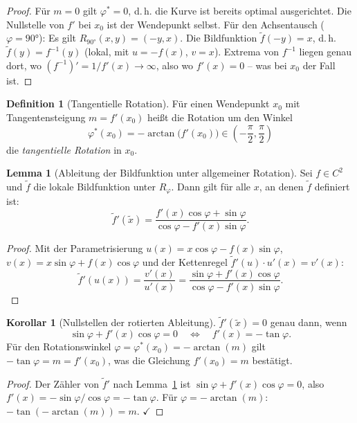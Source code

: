 ﻿\documentclass[12pt, a4paper]{article}
\theoremstyle{definition}
\newtheorem{definition}{Definition}[section]
\newtheorem{lemma}{Lemma}[section]
\newtheorem{korollar}{Korollar}[section]
\begin{document}
	\begin{proof}
		Für $m = 0$ gilt $\varphi^* = 0$, d.\,h. die Kurve ist bereits optimal
		ausgerichtet. Die Nullstelle von $f'$ bei $x_0$ ist der Wendepunkt selbst.
		Für den Achsentausch ($\varphi = 90 °$): Es gilt
		$R_{90 °}(x, y) = (-y, x)$. Die Bildfunktion $\tilde{f}(-y) = x$,
		d.\,h. $\tilde{f}(y) = f^{-1}(y)$ (lokal, mit $u = -f(x)$, $v = x$).
		Extrema von $f^{-1}$ liegen genau dort, wo $(f^{-1})' = 1/f'(x) \to \infty$,
		also wo $f'(x) = 0$ -- was bei $x_0$ der Fall ist.
	\end{proof}
	
	\begin{definition}[Tangentielle Rotation]\label{def:tangentiell}
		Für einen Wendepunkt $x_0$ mit Tangentensteigung $m = f'(x_0)$ heißt die
		Rotation um den Winkel
		\[
		\varphi^*(x_0) = -\arctan\!\bigl(f'(x_0)\bigr) \in \left(-\frac{\pi}{2}, \frac{\pi}{2}\right)
		\]
		die \emph{tangentielle Rotation} in $x_0$.
	\end{definition}
	
	\begin{lemma}[Ableitung der Bildfunktion unter allgemeiner Rotation]
		\label{lem:ableitung}
		Sei $f \in C^2$ und $\tilde{f}$ die lokale Bildfunktion unter $R_\varphi$.
		Dann gilt für alle $x$, an denen $\tilde{f}$ definiert ist:
		\[
		\tilde{f}'(\tilde{x}) = \frac{f'(x)\cos\varphi + \sin\varphi}{\cos\varphi - f'(x)\sin\varphi}.
		\]
	\end{lemma}
	
	\begin{proof}
		Mit der Parametrisierung $u(x) = x\cos\varphi - f(x)\sin\varphi$,
		$v(x) = x\sin\varphi + f(x)\cos\varphi$ und der Kettenregel
		$\tilde{f}'(u)\cdot u'(x) = v'(x)$:
		\[
		\tilde{f}'(u(x)) = \frac{v'(x)}{u'(x)}
		= \frac{\sin\varphi + f'(x)\cos\varphi}{\cos\varphi - f'(x)\sin\varphi}.
		\]
	\end{proof}
	
	\begin{korollar}[Nullstellen der rotierten Ableitung]\label{kor:nullstellen}
		$\tilde{f}'(\tilde{x}) = 0$ genau dann, wenn
		\[
		\sin\varphi + f'(x)\cos\varphi = 0
		\quad\Longleftrightarrow\quad
		f'(x) = -\tan\varphi.
		\]
		Für den Rotationswinkel $\varphi = \varphi^*(x_0) = -\arctan(m)$ gilt
		$-\tan\varphi = m = f'(x_0)$, was die Gleichung $f'(x_0) = m$ bestätigt.
	\end{korollar}
	
	\begin{proof}
		Der Zähler von $\tilde{f}'$ nach Lemma~\ref{lem:ableitung} ist
		$\sin\varphi + f'(x)\cos\varphi = 0$, also $f'(x) = -\sin\varphi/\cos\varphi = -\tan\varphi$.
		Für $\varphi = -\arctan(m)$: $-\tan(-\arctan(m)) = m$. $\checkmark$
	\end{proof}
	
\end{document}
